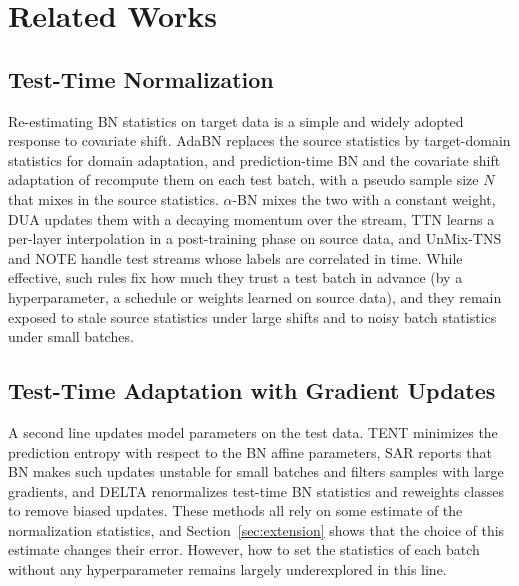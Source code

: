\section{Related Works} \label{apdx:related-works}

\subsection{Test-Time Normalization}
Re-estimating BN statistics on target data is a simple and widely adopted response to covariate shift.
AdaBN \cite{AdaBN} replaces the source statistics by target-domain statistics for domain adaptation, and prediction-time BN \cite{PredictionBN} and the covariate shift adaptation of \citet{BN-Adapt} recompute them on each test batch, \citet{BN-Adapt} with a pseudo sample size $N$ that mixes in the source statistics.
$\alpha$-BN \cite{AlphaBN} mixes the two with a constant weight, DUA \cite{DUA} updates them with a decaying momentum over the stream, TTN \cite{TTN} learns a per-layer interpolation in a post-training phase on source data, and UnMix-TNS \cite{UnMix-TNS} and NOTE \cite{NOTE} handle test streams whose labels are correlated in time.
While effective, such rules fix how much they trust a test batch in advance (by a hyperparameter, a schedule or weights learned on source data), and they remain exposed to stale source statistics under large shifts and to noisy batch statistics under small batches.

\subsection{Test-Time Adaptation with Gradient Updates}
A second line updates model parameters on the test data.
TENT \cite{TENT} minimizes the prediction entropy with respect to the BN affine parameters, SAR \cite{SAR} reports that BN makes such updates unstable for small batches and filters samples with large gradients, and DELTA \cite{DELTA} renormalizes test-time BN statistics and reweights classes to remove biased updates.
These methods all rely on some estimate of the normalization statistics, and Section~\ref{sec:extension} shows that the choice of this estimate changes their error.
However, how to set the statistics of each batch without any hyperparameter remains largely underexplored in this line.

